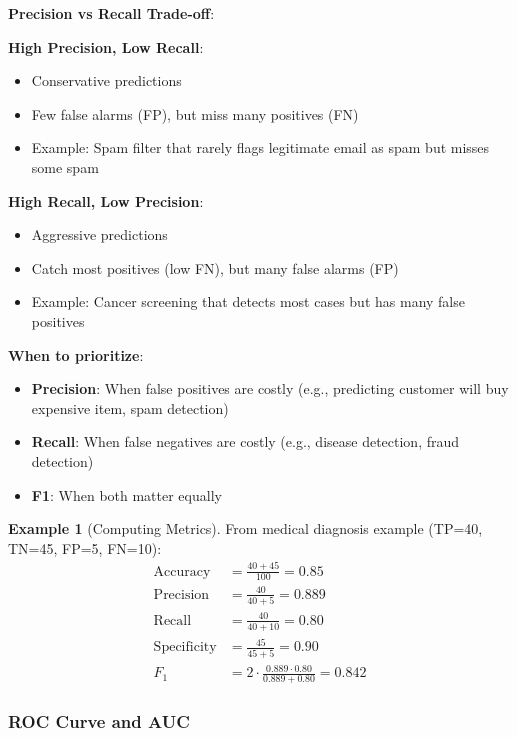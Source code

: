 \documentclass[11pt,twoside]{article}
\numberwithin{equation}{section}
\theoremstyle{plain}
\theoremstyle{definition}
\newtheorem{example}[theorem]{Example}
\theoremstyle{remark}
\newenvironment{keyidea}{
  \begin{tcolorbox}[colback=yellow!5!white,
                    colframe=yellow!50!black,
                    title=Key Idea,
                    breakable,
                    enhanced,
                    sharp corners,
                    boxrule=0.8pt,
                    left=6pt, right=6pt, top=6pt, bottom=6pt]
}{
  \end{tcolorbox}
}
\begin{document}
\begin{keyidea}
\textbf{Precision vs Recall Trade-off}:

\textbf{High Precision, Low Recall}:
\begin{itemize}
\item Conservative predictions
\item Few false alarms (FP), but miss many positives (FN)
\item Example: Spam filter that rarely flags legitimate email as spam but misses some spam
\end{itemize}

\textbf{High Recall, Low Precision}:
\begin{itemize}
\item Aggressive predictions
\item Catch most positives (low FN), but many false alarms (FP)
\item Example: Cancer screening that detects most cases but has many false positives
\end{itemize}

\textbf{When to prioritize}:
\begin{itemize}
\item \textbf{Precision}: When false positives are costly (e.g., predicting customer will buy expensive item, spam detection)
\item \textbf{Recall}: When false negatives are costly (e.g., disease detection, fraud detection)
\item \textbf{F1}: When both matter equally
\end{itemize}
\end{keyidea}

\begin{example}[Computing Metrics]
From medical diagnosis example (TP=40, TN=45, FP=5, FN=10):
\begin{align}
\text{Accuracy} &= \frac{40+45}{100} = 0.85 \\
\text{Precision} &= \frac{40}{40+5} = 0.889 \\
\text{Recall} &= \frac{40}{40+10} = 0.80 \\
\text{Specificity} &= \frac{45}{45+5} = 0.90 \\
F_1 &= 2 \cdot \frac{0.889 \cdot 0.80}{0.889 + 0.80} = 0.842
\end{align}
\end{example}

\subsubsection{ROC Curve and AUC}
\end{document}
